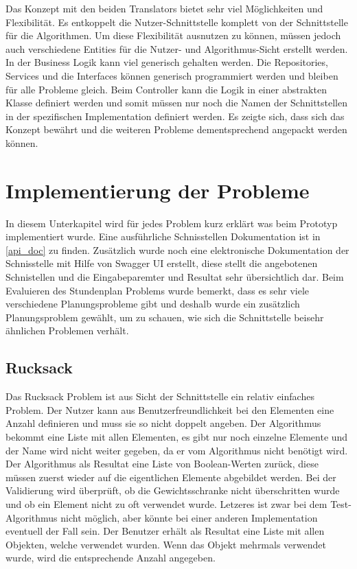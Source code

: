 Das Konzept mit den beiden Translators bietet sehr viel Möglichkeiten und Flexibilität. Es entkoppelt die Nutzer-Schnittstelle komplett von der Schnittstelle für die Algorithmen. Um diese 
Flexibilität ausnutzen zu können, müssen jedoch auch verschiedene Entities für die Nutzer- und Algorithmus-Sicht erstellt werden.\\

In der Business Logik kann viel generisch gehalten werden. Die Repositories, Services und die Interfaces können generisch programmiert werden und bleiben für alle Probleme gleich. Beim 
Controller kann die Logik in einer abstrakten Klasse definiert werden und somit müssen nur noch die Namen der Schnittstellen in der spezifischen Implementation definiert werden. Es zeigte sich, 
dass sich das Konzept bewährt und die weiteren Probleme dementsprechend angepackt werden können.

\section{Implementierung der Probleme}\label{impl_backend}
In diesem Unterkapitel wird für jedes Problem kurz erklärt was beim Prototyp implementiert wurde. Eine ausführliche Schnisstellen Dokumentation ist in \autoref{api_doc} zu finden. Zusätzlich 
wurde noch eine elektronische Dokumentation der Schnisstelle mit Hilfe von Swagger UI erstellt, diese stellt die angebotenen Schnistellen und die Eingabeparemter und Resultat sehr 
übersichtlich dar. Beim Evaluieren des Stundenplan Problems wurde bemerkt, dass es sehr viele verschiedene Planungsprobleme gibt und deshalb wurde ein zusätzlich Planungsproblem gewählt, 
um zu schauen, wie sich die Schnittstelle beisehr ähnlichen Problemen verhält.


%
%
%
%

\subsection{Rucksack}
Das Rucksack Problem ist aus Sicht der Schnittstelle ein relativ einfaches Problem. Der Nutzer kann aus Benutzerfreundlichkeit bei den Elementen eine Anzahl definieren und muss sie so nicht 
doppelt angeben. Der Algorithmus bekommt eine Liste mit allen Elementen, es gibt nur noch einzelne Elemente und der Name wird nicht weiter gegeben, da er vom Algorithmus nicht benötigt wird. 
Der Algorithmus als Resultat eine Liste von Boolean-Werten zurück, diese müssen zuerst wieder auf die eigentlichen Elemente abgebildet werden. Bei der Validierung wird überprüft, ob die 
Gewichtsschranke nicht überschritten wurde und ob ein Element nicht zu oft verwendet wurde. Letzeres ist zwar bei dem Test-Algorithmus nicht möglich, aber könnte bei einer anderen
Implementation eventuell der Fall sein. Der Benutzer erhält als Resultat eine Liste mit allen Objekten, welche verwendet wurden. Wenn das Objekt mehrmals verwendet wurde, wird die 
entsprechende Anzahl angegeben.

